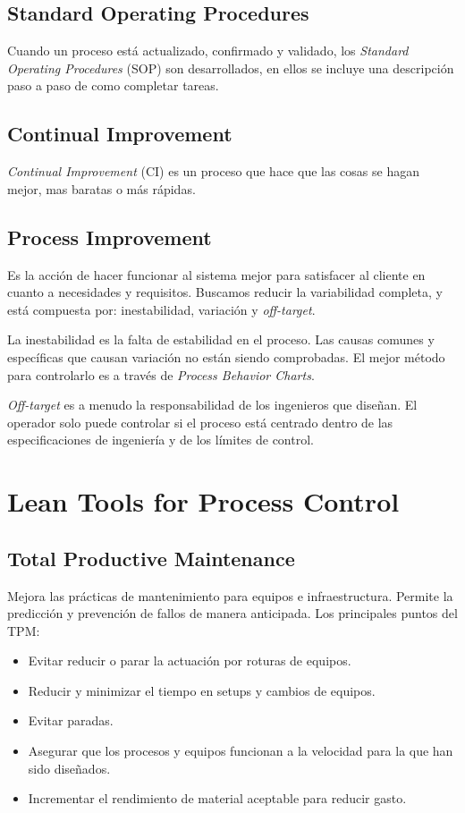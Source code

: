 \documentclass[oneside]{book}
\begin{document}
\section{Standard Operating Procedures}

Cuando un proceso está actualizado, confirmado y validado, los \textit{Standard Operating Procedures} (SOP) son desarrollados, en ellos se incluye una descripción paso a paso de como completar tareas. 

\section{Continual Improvement}

\textit{Continual Improvement} (CI) es un proceso que hace que las cosas se hagan mejor, mas baratas o más rápidas. 

\section{Process Improvement}

Es la acción de hacer funcionar al sistema mejor para satisfacer al cliente en cuanto a necesidades y requisitos. Buscamos reducir la variabilidad completa, y está compuesta por: inestabilidad, variación y \textit{off-target}.

La inestabilidad es la falta de estabilidad en el proceso. Las causas comunes y específicas que causan variación no están siendo comprobadas. El mejor método para controlarlo es a través de \textit{Process Behavior Charts}.

\textit{Off-target} es a menudo la responsabilidad de los ingenieros que diseñan. El operador solo puede controlar si el proceso está centrado dentro de las especificaciones de ingeniería y de los límites de control.

\chapter{Lean Tools for Process Control}

\section{Total Productive Maintenance}

Mejora las prácticas de mantenimiento para equipos e infraestructura. Permite la predicción y prevención de fallos de manera anticipada. Los principales puntos del TPM:
\begin{itemize}
	\item Evitar reducir o parar la actuación por roturas de equipos.
	\item Reducir y minimizar el tiempo en setups y cambios de equipos.
	\item Evitar paradas.
	\item Asegurar que los procesos y equipos funcionan a la velocidad para la que han sido diseñados.
	\item Incrementar el rendimiento de material aceptable para reducir gasto.
\end{itemize}
\end{document}
